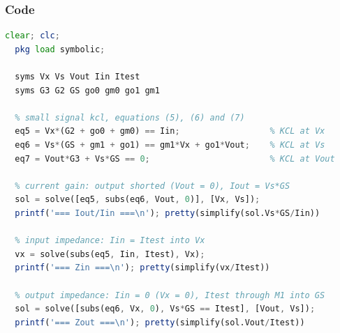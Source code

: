 \subsubsection{Code}
\begin{lstlisting}[language=Octave]
  clear; clc;
  pkg load symbolic;

  syms Vx Vs Vout Iin Itest
  syms G3 G2 GS go0 gm0 go1 gm1

  % small signal kcl, equations (5), (6) and (7)
  eq5 = Vx*(G2 + go0 + gm0) == Iin;                  % KCL at Vx
  eq6 = Vs*(GS + gm1 + go1) == gm1*Vx + go1*Vout;    % KCL at Vs
  eq7 = Vout*G3 + Vs*GS == 0;                        % KCL at Vout

  % current gain: output shorted (Vout = 0), Iout = Vs*GS
  sol = solve([eq5, subs(eq6, Vout, 0)], [Vx, Vs]);
  printf('=== Iout/Iin ===\n'); pretty(simplify(sol.Vs*GS/Iin))

  % input impedance: Iin = Itest into Vx
  vx = solve(subs(eq5, Iin, Itest), Vx);
  printf('=== Zin ===\n'); pretty(simplify(vx/Itest))

  % output impedance: Iin = 0 (Vx = 0), Itest through M1 into GS
  sol = solve([subs(eq6, Vx, 0), Vs*GS == Itest], [Vout, Vs]);
  printf('=== Zout ===\n'); pretty(simplify(sol.Vout/Itest))
\end{lstlisting}
